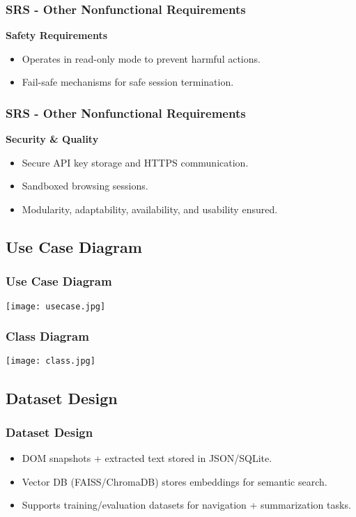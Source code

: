 \documentclass{beamer}
\begin{document}
\begin{frame}
\frametitle{SRS - Other Nonfunctional Requirements}
\textbf{Safety Requirements}
\begin{itemize}
    \item Operates in read-only mode to prevent harmful actions.  
    \item Fail-safe mechanisms for safe session termination.  
\end{itemize}
\end{frame}

\begin{frame}
\frametitle{SRS - Other Nonfunctional Requirements}
\textbf{Security \& Quality}
\begin{itemize}
    \item Secure API key storage and HTTPS communication.  
    \item Sandboxed browsing sessions.  
    \item Modularity, adaptability, availability, and usability ensured.  
\end{itemize}
\end{frame}


\subsection{Use Case Diagram}
\begin{frame}
\frametitle{Use Case Diagram}
\centering
\texttt{[image: usecase.jpg]} %
\end{frame}

\begin{frame}
\frametitle{Class Diagram}
\centering
\texttt{[image: class.jpg]} %
\end{frame}

\subsection{Dataset Design}
\begin{frame}
\frametitle{Dataset Design}
\begin{itemize}
    \item DOM snapshots + extracted text stored in JSON/SQLite.  
    \item Vector DB (FAISS/ChromaDB) stores embeddings for semantic search.  
    \item Supports training/evaluation datasets for navigation + summarization tasks.  
\end{itemize}
\end{frame}
\end{document}
